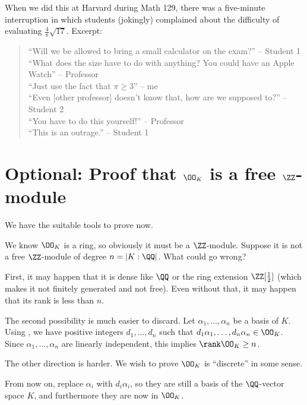 \begin{remark}
	When we did this at Harvard during Math 129,
	there was a five-minute interruption in which students (jokingly) complained
	about the difficulty of evaluating $\frac{4}{\pi} \sqrt{17}$. Excerpt:
	\begin{quotation}
		\footnotesize
		``Will we be allowed to bring a small calculator on the exam?'' -- Student 1 \\
		``What does the size have to do with anything?  You could have an Apple Watch'' -- Professor \\
		``Just use the fact that $\pi \ge 3$'' -- me \\
		``Even [other professor] doesn't know that, how are we supposed to?'' -- Student 2 \\
		``You have to do this yourself!'' -- Professor \\
		``This is an outrage.'' -- Student 1
	\end{quotation}
\end{remark}

\section{Optional: Proof that $\OO_K$ is a free $\ZZ$-module}

We have the suitable tools to prove  now.

We know $\OO_K$ is a ring, so obviously it must be a $\ZZ$-module.
Suppose it is not a free $\ZZ$-module of degree $n = |K:\QQ|$. What could go wrong?
\begin{itemize}
	\ii First, it may happen that it is dense like $\QQ$ or the ring extension $\ZZ[\frac{1}{2}]$
	(which makes it not finitely generated and not free).
	\ii Even without that, it may happen that its rank is less than $n$.
\end{itemize}

The second possibility is much easier to discard.
Let $\alpha_1, \dots, \alpha_n$ be a basis of $K$.
Using , we have positive integers $d_1, \dots, d_n$ such that
$d_1 \alpha_1, \dots, d_n \alpha_n \in \OO_K$.
Since $\alpha_1, \dots, \alpha_n$ are linearly independent,
this implies $\rank \OO_K \geq n$.

The other direction is harder. We wish to prove $\OO_K$ is ``discrete'' in some sense.

From now on, replace $\alpha_i$ with $d_i \alpha_i$, so they are still a basis of the $\QQ$-vector
space $K$, and furthermore they are now in $\OO_K$.

